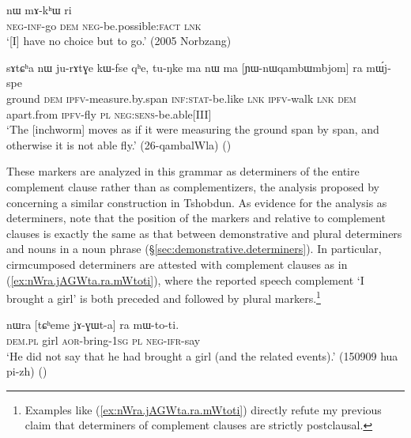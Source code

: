  \begin{exe}
\ex \label{ex:mAkACe.nW.mAkhW}
\gll [mɤ-kɤ-ɕe] nɯ mɤ-kʰɯ ri \\
\textsc{neg}-\textsc{inf}-go \textsc{dem} \textsc{neg}-be.possible:\textsc{fact} \textsc{lnk} \\
\glt `[I] have no choice but to go.' (2005 Norbzang)
\end{exe}

 \begin{exe}
\ex \label{ex:YWnWqambWmbjom.ra.mWjspe}
\gll  sɤtɕʰa nɯ ju-rɤtɣe kɯ-fse qʰe, tu-ŋke ma nɯ ma [ɲɯ-nɯqambɯmbjom] ra mɯ́j-spe \\
ground \textsc{dem} \textsc{ipfv}-measure.by.span \textsc{inf}:\textsc{stat}-be.like \textsc{lnk} \textsc{ipfv}-walk \textsc{lnk} \textsc{dem} apart.from \textsc{ipfv}-fly \textsc{pl} \textsc{neg}:\textsc{sens}-be.able[III] \\
\glt `The [inchworm] moves as if it were measuring the ground span by span, and otherwise it is not able fly.' (26-qambalWla)
()
\end{exe}
 
These markers are analyzed in this grammar as determiners of the entire complement clause rather than as complementizers, the analysis proposed by \citet[481]{sun12complementation} concerning a similar construction in Tshobdun. As evidence for the analysis as determiners, note that the position of the markers  and  relative to complement clauses  is exactly the same as that between demonstrative and plural determiners and nouns in a noun phrase (§\ref{sec:demonstrative.determiners}). In particular, cirmcumposed determiners are attested with complement clauses as in (\ref{ex:nWra.jAGWta.ra.mWtoti}), where the reported speech complement  `I brought a girl' is both preceded and followed by plural markers.\footnote{Examples like (\ref{ex:nWra.jAGWta.ra.mWtoti}) directly refute my previous claim \citep[258]{jacques16complementation} that determiners of complement clauses are strictly postclausal. }

\begin{exe}
\ex \label{ex:nWra.jAGWta.ra.mWtoti}
\gll nɯra [tɕʰeme jɤ-ɣɯt-a] ra mɯ-to-ti. \\
\textsc{dem}.\textsc{pl} girl \textsc{aor}-bring-\textsc{1sg} \textsc{pl} \textsc{neg}-\textsc{ifr}-say \\
\glt  `He did not say that he had brought a girl (and the related events).'  (150909 hua pi-zh)
()
\end{exe}
 
